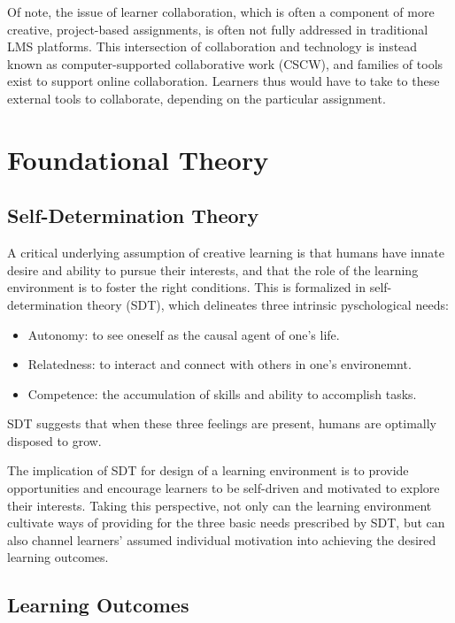 \documentclass[12pt,twoside]{mitthesis}
\begin{document}
Of note, the issue of learner collaboration, which is often a component of more creative, project-based assignments, is often not fully addressed in traditional LMS platforms. This intersection of collaboration and technology is instead known as computer-supported collaborative work (CSCW), and families of tools exist to support online collaboration. Learners thus would have to take to these external tools to collaborate, depending on the particular assignment.

\section{Foundational Theory}

\subsection{Self-Determination Theory}

A critical underlying assumption of creative learning is that humans have innate desire and ability to pursue their interests, and that the role of the learning environment is to foster the right conditions. This is formalized in self-determination theory (SDT), which delineates three intrinsic pyschological needs:
\begin{itemize}
\item Autonomy: to see oneself as the causal agent of one's life.
\item Relatedness: to interact and connect with others in one's environemnt.
\item Competence: the accumulation of skills and ability to accomplish tasks.
\end{itemize}
SDT suggests that when these three feelings are present, humans are optimally disposed to grow.~\cite{ryan2000self}\cite{selfdetermination2}

The implication of SDT for design of a learning environment is to provide opportunities and encourage learners to be self-driven and motivated to explore their interests. Taking this perspective, not only can the learning environment cultivate ways of providing for the three basic needs prescribed by SDT, but can also channel learners' assumed individual motivation into achieving the desired learning outcomes.~\cite{selfdetermination}\cite{niemiec2009autonomy}

\subsection{Learning Outcomes}
\end{document}
